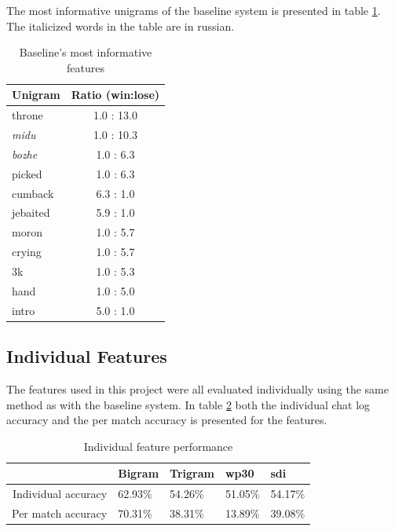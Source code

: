 \documentclass[12pt,a4paper]{article}
\begin{document}
The most informative unigrams of the baseline system is presented in table \ref{tab:unigrams}.
The italicized words in the table are in russian. 
\begin{table}[h]
    \begin{center}
        \begin{tabular}{l | c}
            Unigram    & Ratio (win:lose) \\\hline
            throne            & 1.0 : 13.0 \\
            \textit{midu}     & 1.0 : 10.3 \\
            \textit{bozhe}       & 1.0 : 6.3 \\
            picked    & 1.0 : 6.3 \\
            cumback   & 6.3 : 1.0 \\
            jebaited          & 5.9 : 1.0 \\
            moron           & 1.0 : 5.7 \\
            crying                & 1.0 : 5.7 \\
            3k           & 1.0 : 5.3\\
            hand            & 1.0 : 5.0 \\
            intro   & 5.0 : 1.0 \\
        \end{tabular}
        \caption{Baseline's most informative features}
        \label{tab:unigrams}
    \end{center}
\end{table}

\subsection{Individual Features}
The features used in this project were all evaluated individually using the same method as with the baseline system.
In table \ref{tab:featpref} both the individual chat log accuracy and the per match accuracy is presented
for the features.

\begin{table}[h]
    \begin{center}
        \begin{tabular}{ r | l l l l }
                                  & Bigram  & Trigram & wp30    & sdi \\ \hline
            Individual accuracy   & 62.93\% & 54.26\% & 51.05\% & 54.17\% \\
            Per match accuracy    & 70.31\% & 38.31\% & 13.89\% & 39.08\% \\
        \end{tabular}
        \caption{Individual feature performance}
        \label{tab:featpref}
    \end{center}
\end{table}
\end{document}
